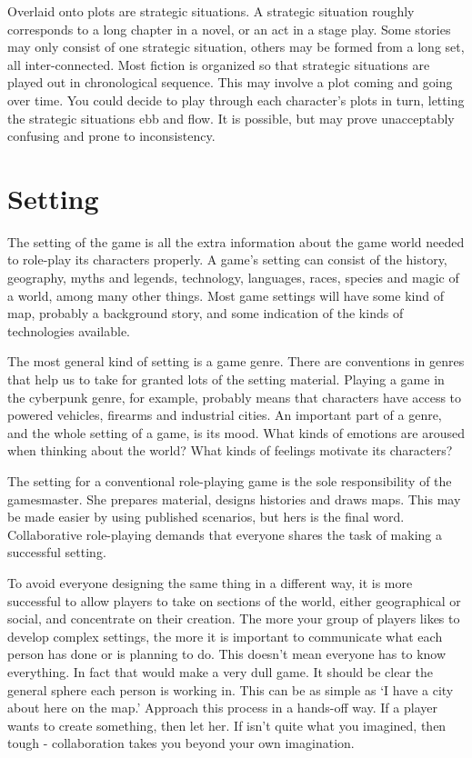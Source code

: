 \documentclass[twoside]{book}
\begin{document}
Overlaid onto plots are strategic situations. A strategic situation
roughly corresponds to a long chapter in a novel, or an act in a stage
play. Some stories may only consist of one strategic situation, others
may be formed from a long set, all inter-connected. Most fiction is
organized so that strategic situations are played out in chronological
sequence. This may involve a plot coming and going over time. You
could decide to play through each character's plots in turn, letting
the strategic situations ebb and flow. It is possible, but may prove
unacceptably confusing and prone to inconsistency.

\section{Setting}

The setting of the game is all the extra information about the game
world needed to role-play its characters properly. A game's setting
can consist of the history, geography, myths and legends, technology,
languages, races, species and magic of a world, among many other
things. Most game settings will have some kind of map, probably a
background story, and some indication of the kinds of technologies
available.

The most general kind of setting is a game genre. There are
conventions in genres that help us to take for granted lots of the
setting material. Playing a game in the cyberpunk genre, for example,
probably means that characters have access to powered vehicles,
firearms and industrial cities. An important part of a genre, and the
whole setting of a game, is its mood. What kinds of emotions are
aroused when thinking about the world? What kinds of feelings motivate
its characters?

The setting for a conventional role-playing game is the sole
responsibility of the gamesmaster. She prepares material, designs
histories and draws maps. This may be made easier by using published
scenarios, but hers is the final word. Collaborative role-playing
demands that everyone shares the task of making a successful setting.

To avoid everyone designing the same thing in a different way, it is
more successful to allow players to take on sections of the world,
either geographical or social, and concentrate on their creation. The
more your group of players likes to develop complex settings, the more
it is important to communicate what each person has done or is
planning to do. This doesn't mean everyone has to know everything. In
fact that would make a very dull game. It should be clear the general
sphere each person is working in. This can be as simple as `I have a
city about here on the map.' Approach this process in a hands-off
way. If a player wants to create something, then let her. If isn't
quite what you imagined, then tough - collaboration takes you beyond
your own imagination.
\end{document}
